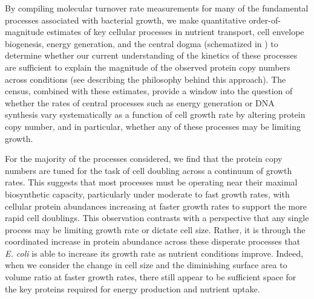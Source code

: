 By compiling molecular turnover rate measurements for many of the
fundamental processes associated with bacterial growth, we make quantitative
order-of-magnitude estimates of key cellular processes in nutrient transport,
cell envelope biogenesis, energy generation, and the central dogma (schematized
in ) to determine whether our current understanding of the
kinetics of these processes are sufficient to explain the magnitude of the
observed protein copy numbers across conditions (see 
describing the philosophy behind this approach). The census, combined with these
estimates, provide a window into the question of whether the rates of central
processes such as energy generation or DNA synthesis vary systematically as a
function of cell growth rate by altering protein copy number, and in particular,
whether any of these processes may be limiting growth.

For the majority of the processes considered, we find that the protein copy
numbers are tuned for the task of cell doubling across a continuum of growth
rates. This suggests that most processes must be operating near their maximal
biosynthetic capacity, particularly under moderate to fast growth rates,  with
cellular protein abundances increasing at faster growth rates to support the
more rapid cell doublings. This observation contrasts with a perspective that
any single process may be limiting growth rate or dictate cell size. Rather, it
is through the coordinated increase in protein abundance across these disperate
processes that \textit{E. coli} is able to increase its growth rate as nutrient
conditions improve. Indeed, when we consider the change in cell size and  the
diminishing  surface area to volume ratio at faster growth rates, there still
appear to be sufficient space  for the key proteins required for energy
production  and nutrient uptake.


